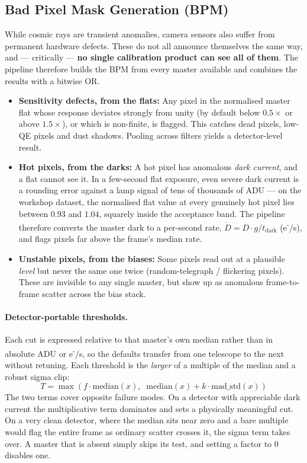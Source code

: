 \documentclass[11pt,a4paper]{article}
\begin{document}
\subsection{Bad Pixel Mask Generation (BPM)}\label{app:bpm}
While cosmic rays are transient anomalies, camera sensors also suffer from permanent hardware defects. These do not all announce themselves the same way, and --- critically --- \textbf{no single calibration product can see all of them}. The pipeline therefore builds the BPM from every master available and combines the results with a bitwise OR.
\begin{itemize}[leftmargin=*]
    \item \textbf{Sensitivity defects, from the flats:} Any pixel in the normalised master flat whose response deviates strongly from unity (by default below $0.5\times$ or above $1.5\times$), or which is non-finite, is flagged. This catches dead pixels, low-QE pixels and dust shadows. Pooling across filters yields a detector-level result.
    \item \textbf{Hot pixels, from the darks:} A hot pixel has anomalous \emph{dark current}, and a flat cannot see it. In a few-second flat exposure, even severe dark current is a rounding error against a lamp signal of tens of thousands of ADU --- on the workshop dataset, the normalised flat value at every genuinely hot pixel lies between $0.93$ and $1.04$, squarely inside the acceptance band. The pipeline therefore converts the master dark to a per-second rate, $\dot{D} = D \cdot g / t_{\mathrm{dark}}$ (e\textsuperscript{-}/s), and flags pixels far above the frame's median rate.
    \item \textbf{Unstable pixels, from the biases:} Some pixels read out at a plausible \emph{level} but never the same one twice (random-telegraph / flickering pixels). These are invisible to any single master, but show up as anomalous frame-to-frame scatter across the bias stack.
\end{itemize}

\paragraph{Detector-portable thresholds.} Each cut is expressed relative to that master's own median rather than in absolute ADU or e\textsuperscript{-}/s, so the defaults transfer from one telescope to the next without retuning. Each threshold is the \emph{larger} of a multiple of the median and a robust sigma clip:
\[
    T = \max\!\left(f \cdot \mathrm{median}(x),\;\; \mathrm{median}(x) + k \cdot \mathrm{mad\_std}(x)\right)
\]
The two terms cover opposite failure modes. On a detector with appreciable dark current the multiplicative term dominates and sets a physically meaningful cut. On a very clean detector, where the median sits near zero and a bare multiple would flag the entire frame as ordinary scatter crosses it, the sigma term takes over. A master that is absent simply skips its test, and setting a factor to $0$ disables one.
\end{document}
